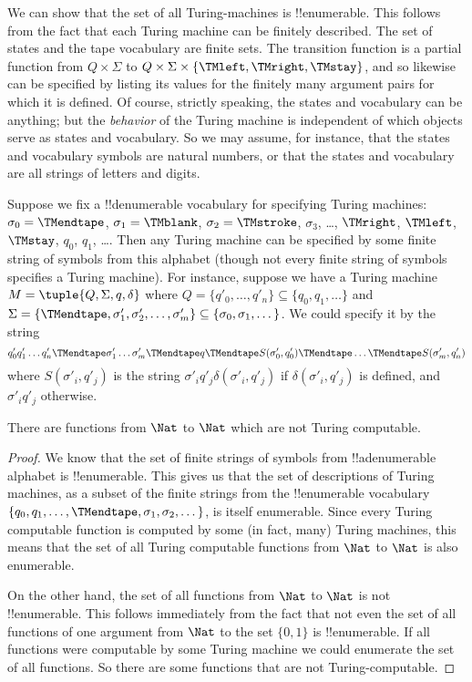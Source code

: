 \documentclass[../../../include/open-logic-section]{subfiles}
\begin{document}

\begin{explain}
We can show that the set of all Turing-machines is
!!{enumerable}. This follows from the fact that each Turing machine
can be finitely described.  The set of states and the tape vocabulary
are finite sets.  The transition function is a partial function from
$Q \times \Sigma$ to $Q \times \Sigma \times \{\TMleft, \TMright,
\TMstay\}$, and so likewise can be specified by listing its values for
the finitely many argument pairs for which it is defined.  Of course,
strictly speaking, the states and vocabulary can be anything; but the
\emph{behavior} of the Turing machine is independent of which objects
serve as states and vocabulary. So we may assume, for instance, that
the states and vocabulary symbols are natural numbers, or that the
states and vocabulary are all strings of letters and digits.

Suppose we fix a !!{denumerable} vocabulary for specifying Turing
machines: $\sigma_0 = \TMendtape$, $\sigma_1 = \TMblank$, $\sigma_2 =
\TMstroke$, $\sigma_3$, \dots, $\TMright$, $\TMleft$, $\TMstay$,
$q_0$, $q_1$, \dots. Then any Turing machine can be specified by some
finite string of symbols from this alphabet (though not every finite
string of symbols specifies a Turing machine). For instance, suppose
we have a Turing machine $M = \tuple{Q, \Sigma, q, \delta}$ where $Q =
\{q'_0, \dots, q'_n\} \subseteq \{q_0, q_1, \dots \}$ and $\Sigma
= \{\TMendtape, \sigma'_1, \sigma'_2, \dots, \sigma'_m\}
\subseteq \{\sigma_0, \sigma_1, \dots\}$. We could specify it by
the string
\[
q'_0 q'_1 \dots q'_n \TMendtape \sigma'_1 \dots \sigma'_m \TMendtape q
\TMendtape S(\sigma'_0,q'_0)\TMendtape \dots \TMendtape S(\sigma'_m, q'_n)
\]
where $S(\sigma'_i, q'_j) $ is the string $\sigma'_i q'_j
\delta(\sigma'_i, q'_j)$ if $\delta(\sigma'_i,q'_j)$ is defined, and
$\sigma'_i q'_j$ otherwise.
\end{explain}

\begin{thm}
There are functions from $\Nat$ to $\Nat$ which are not Turing
computable.
\end{thm}

\begin{proof}
We know that the set of finite strings of symbols from
!!a{denumerable} alphabet is !!{enumerable}. This gives us that the
set of descriptions of Turing machines, as a subset of the finite
strings from the !!{enumerable} vocabulary $\{q_0, q_1, \dots,
\TMendtape, \sigma_1, \sigma_2, \dots\}$, is itself enumerable.  Since
every Turing computable function is computed by some (in fact, many)
Turing machines, this means that the set of all Turing computable
functions from $\Nat$ to $\Nat$ is also enumerable.

On the other hand, the set of all functions from $\Nat$ to $\Nat$ is
not !!{enumerable}. This follows immediately from the fact that not
even the set of all functions of one argument from $\Nat$
to the set $\{0,1\}$ is !!{enumerable}.  If all functions
were computable by some Turing machine we could enumerate the set of
all functions. So there are some functions that are not
Turing-computable. 
\end{proof}
\end{document}
